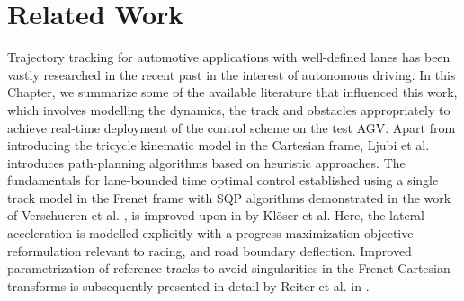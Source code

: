\section{Related Work}\label{back_related}
Trajectory tracking for automotive applications with well-defined lanes has been vastly researched in the recent past in the interest of autonomous driving. In this Chapter, we summarize some of the available literature that influenced this work, which involves modelling the dynamics, the track and obstacles appropriately to achieve real-time deployment of the control scheme on the test \ac{AGV}. Apart from introducing the tricycle kinematic model in the Cartesian frame, Ljubi et al. \cite{ljubi_path_2023} introduces path-planning algorithms based on heuristic approaches. The fundamentals for lane-bounded time optimal control established using a single track model in the Frenet frame with \ac{SQP} algorithms demonstrated in the work of Verschueren et al. \cite{verschueren_towards_2014}, is improved upon in  \cite{kloeser_nmpc_2020} by Klöser et al. Here, the lateral acceleration is modelled explicitly with a progress maximization objective reformulation relevant to racing, and road boundary deflection. Improved parametrization of reference tracks to avoid singularities in the Frenet-Cartesian transforms is subsequently presented in detail by Reiter et al. in \cite{reiter_parameterization_2021}.

